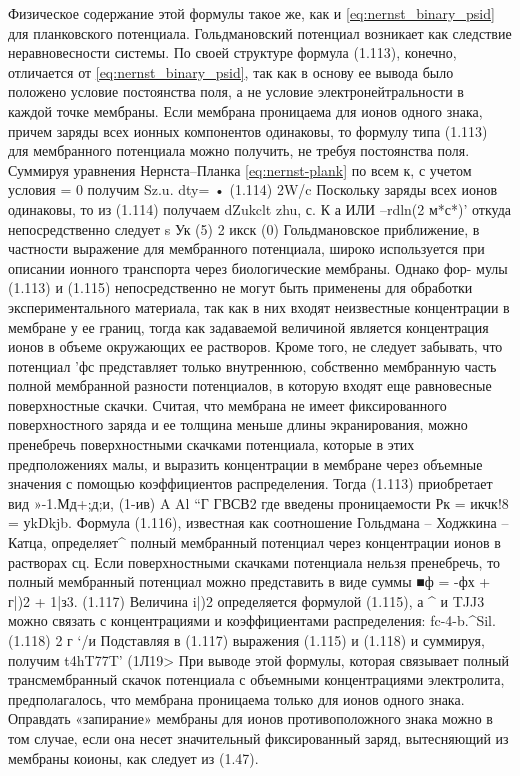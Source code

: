 Физическое содержание этой формулы такое же, как и \eqref{eq:nernst_binary_psid} для планковского потенциала. Гольдмановский потенциал возникает как следствие неравновесности системы. По своей структуре формула (1.113), конечно, отличается от \eqref{eq:nernst_binary_psid}, так как в основу ее вывода было положено условие постоянства поля, а не условие электронейтральности в каждой точке мембраны.
Если мембрана проницаема для ионов одного знака, причем заряды всех ионных компонентов одинаковы, то формулу типа (1.113) для мембранного потенциала можно получить, не требуя постоянства поля. Суммируя уравнения Нернста--Планка \eqref{eq:nernst-plank} по всем к, с учетом условия = 0 получим
Sz.u.
dty= • (1.114)
2W/c
Поскольку заряды всех ионов одинаковы, то из (1.114) получаем
dZukclt
zhu, с.
К а
ИЛИ
--rdln(2 м*с*)’
откуда непосредственно следует s Ук (5)
2 икск (0)
Гольдмановское приближение, в частности выражение для мембранного потенциала, широко используется при описании ионного транспорта через биологические мембраны. Однако фор-
мулы (1.113) и (1.115) непосредственно не могут быть применены для обработки экспериментального материала, так как в них входят неизвестные концентрации в мембране у ее границ, тогда как задаваемой величиной является концентрация ионов в объеме окружающих ее растворов. Кроме того, не следует забывать, что потенциал 'фс представляет только внутреннюю, собственно мембранную часть полной мембранной разности потенциалов, в которую входят еще равновесные поверхностные скачки. Считая, что мембрана не имеет фиксированного поверхностного заряда и ее толщина меньше длины экранирования, можно пренебречь поверхностными скачками потенциала, которые в этих предположениях малы, и выразить концентрации в мембране через объемные значения с помощью коэффициентов распределения. Тогда (1.113) приобретает вид
»-1.Мд+;д;и, (1-ив)
A Al “Г ГВСВ2
где введены проницаемости Рк = икчк!8 = уkDkjb. Формула (1.116), известная как соотношение Гольдмана -- Ходжкина -- Катца, определяет^ полный мембранный потенциал через концентрации ионов в растворах сц.
Если поверхностными скачками потенциала нельзя пренебречь, то полный мембранный потенциал можно представить в виде суммы
■ф = -фх + г|)2 + 1|з3. (1.117)
Величина i|)2 определяется формулой (1.115), а ^ и TJJ3 можно связать с концентрациями и коэффициентами распределения:
fc-4-b.^Sil. (1.118)
2 г ‘/и
Подставляя в (1.117) выражения (1.115) и (1.118) и суммируя, получим
t4hT77T' (1Л19>
При выводе этой формулы, которая связывает полный трансмембранный скачок потенциала с объемными концентрациями электролита, предполагалось, что мембрана проницаема только для ионов одного знака. Оправдать «запирание» мембраны для ионов противоположного знака можно в том случае, если она несет значительный фиксированный заряд, вытесняющий из мембраны коионы, как следует из (1.47).
